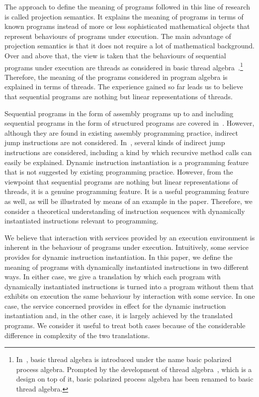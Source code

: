 \documentclass[fleqn]{llncs}
\begin{document}
The approach to define the meaning of programs followed in this line of
research is called projection semantics.
It explains the meaning of programs in terms of known programs instead
of more or less sophisticated mathematical objects that represent
behaviours of programs under execution.
The main advantage of projection semantics is that it does not require a
lot of mathematical background.
Over and above that, the view is taken that the behaviours of sequential
programs under execution are threads as considered in basic thread
algebra~\cite{BL02a}.\footnote
{In~\cite{BL02a}, basic thread algebra is introduced under the name
basic polarized process algebra.
 Prompted by the development of thread algebra~\cite{BM04c}, which is a
 design on top of it, basic polarized process algebra has been renamed
 to basic thread algebra.
}
Therefore, the meaning of the programs considered in program algebra is
explained in terms of threads.
The experience gained so far leads us to believe that sequential
programs are nothing but linear representations of threads.

Sequential programs in the form of assembly programs up to and including
sequential programs in the form of structured programs are covered
in~\cite{BL02a}.
However, although they are found in existing assembly programming
practice, indirect jump instructions are not considered.
In~\cite{BM07e}, several kinds of indirect jump instructions are
considered, including a kind by which recursive method calls can easily
be explained.
Dynamic instruction instantiation is a programming feature that is not
suggested by existing programming practice.
However, from the viewpoint that sequential programs are nothing but
linear representations of threads, it is a genuine programming feature.
It is a useful programming feature as well, as will be illustrated by
means of an example in the paper.
Therefore, we consider a theoretical understanding of instruction
sequences with dynamically instantiated instructions relevant to
programming.

We believe that interaction with services provided by an execution
environment is inherent in the behaviour of programs under execution.
Intuitively, some service provides for dynamic instruction
instantiation.
In this paper, we define the meaning of programs with dynamically
instantiated instructions in two different ways.
In either case, we give a translation by which each program with
dynamically instantiated instructions is turned into a program without
them that exhibits on execution the same behaviour by interaction with
some service.
In one case, the service concerned provides in effect for the dynamic
instruction instantiation and, in the other case, it is largely achieved
by the translated programs.
We consider it useful to treat both cases because of the considerable
difference in complexity of the two translations.
\end{document}
